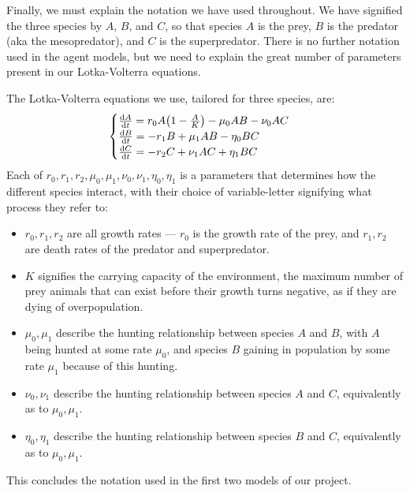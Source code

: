 \documentclass{article}
\begin{document}
Finally, we must explain the notation we have used throughout. We have signified the three species by $A$, $B$, and $C$, so that species $A$ is the prey, $B$ is the predator (aka the mesopredator), and $C$ is the superpredator. There is no further notation used in the agent models, but we need to explain the great number of parameters present in our Lotka-Volterra equations.\par
The Lotka-Volterra equations we use, tailored for three species, are:
$$\begin{cases}
    \dv{A}{t} = r_0A\qty(1-\frac{A}{K}) - \mu_0AB - \nu_0AC\\
    \dv{B}{t} = -r_1B + \mu_1AB - \eta_0BC\\
    \dv{C}{t} = -r_2C + \nu_1AC + \eta_1BC
\end{cases}$$
Each of $r_0,r_1,r_2,\mu_0,\mu_1,\nu_0,\nu_1,\eta_0,\eta_1$ is a parameters that determines how the different species interact, with their choice of variable-letter signifying what process they refer to:\begin{itemize}
    \item $r_0,r_1,r_2$ are all growth rates --- $r_0$ is the growth rate of the prey, and $r_1,r_2$ are death rates of the predator and superpredator.
    \item $K$ signifies the carrying capacity of the environment, the maximum number of prey animals that can exist before their growth turns negative, as if they are dying of overpopulation.
    \item $\mu_0,\mu_1$ describe the hunting relationship between species $A$ and $B$, with $A$ being hunted at some rate $\mu_0$, and species $B$ gaining in population by some rate $\mu_1$ because of this hunting.
    \item $\nu_0,\nu_1$ describe the hunting relationship between species $A$ and $C$, equivalently as to $\mu_0,\mu_1$.
    \item $\eta_0,\eta_1$ describe the hunting relationship between species $B$ and $C$, equivalently as to $\mu_0,\mu_1$.
\end{itemize}
This concludes the notation used in the first two models of our project.
\end{document}
